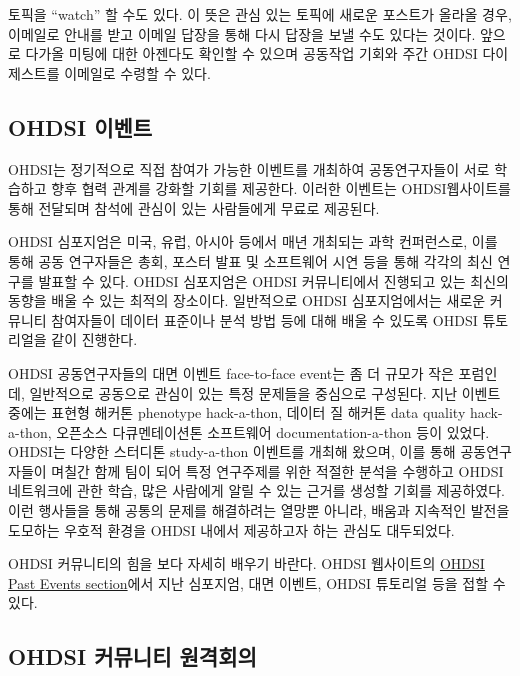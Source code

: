 \documentclass[10.5pt]{book}
\theoremstyle{definition}
\theoremstyle{definition}
\theoremstyle{definition}
\theoremstyle{remark}
\let\BeginKnitrBlock\begin \let\EndKnitrBlock\end
\begin{document}
\BeginKnitrBlock{rmdimportant}
토픽을 ``watch'' 할 수도 있다. 이 뜻은 관심 있는 토픽에 새로운 포스트가
올라올 경우, 이메일로 안내를 받고 이메일 답장을 통해 다시 답장을 보낼
수도 있다는 것이다. 앞으로 다가올 미팅에 대한 아젠다도 확인할 수 있으며
공동작업 기회와 주간 OHDSI 다이제스트를 이메일로 수령할 수 있다.
\EndKnitrBlock{rmdimportant}

\hypertarget{ohdsi-}{\subsection{OHDSI 이벤트}\label{ohdsi-}}

OHDSI는 정기적으로 직접 참여가 가능한 이벤트를 개최하여 공동연구자들이
서로 학습하고 향후 협력 관계를 강화할 기회를 제공한다. 이러한 이벤트는
OHDSI웹사이트를 통해 전달되며 참석에 관심이 있는 사람들에게 무료로
제공된다.

OHDSI 심포지엄은 미국, 유럽, 아시아 등에서 매년 개최되는 과학
컨퍼런스로, 이를 통해 공동 연구자들은 총회, 포스터 발표 및 소프트웨어
시연 등을 통해 각각의 최신 연구를 발표할 수 있다. OHDSI 심포지엄은 OHDSI
커뮤니티에서 진행되고 있는 최신의 동향을 배울 수 있는 최적의 장소이다.
일반적으로 OHDSI 심포지엄에서는 새로운 커뮤니티 참여자들이 데이터
표준이나 분석 방법 등에 대해 배울 수 있도록 OHDSI 튜토리얼을 같이
진행한다.

OHDSI 공동연구자들의 대면 이벤트 face-to-face event는 좀 더 규모가 작은
포럼인데, 일반적으로 공동으로 관심이 있는 특정 문제들을 중심으로
구성된다. 지난 이벤트 중에는 표현형 해커톤 phenotype hack-a-thon, 데이터
질 해커톤 data quality hack-a-thon, 오픈소스 다큐멘테이션톤 소프트웨어
documentation-a-thon 등이 있었다. OHDSI는 다양한 스터디톤 study-a-thon
이벤트를 개최해 왔으며, 이를 통해 공동연구자들이 며칠간 함께 팀이 되어
특정 연구주제를 위한 적절한 분석을 수행하고 OHDSI 네트워크에 관한 학습,
많은 사람에게 알릴 수 있는 근거를 생성할 기회를 제공하였다. 이런
행사들을 통해 공통의 문제를 해결하려는 열망뿐 아니라, 배움과 지속적인
발전을 도모하는 우호적 환경을 OHDSI 내에서 제공하고자 하는 관심도
대두되었다.

OHDSI 커뮤니티의 힘을 보다 자세히 배우기 바란다. OHDSI 웹사이트의
\href{https://www.ohdsi.org/past-events/}{OHDSI Past Events section}에서
지난 심포지엄, 대면 이벤트, OHDSI 튜토리얼 등을 접할 수 있다.

\subsection{OHDSI 커뮤니티 원격회의}\label{ohdsi--}
\end{document}
